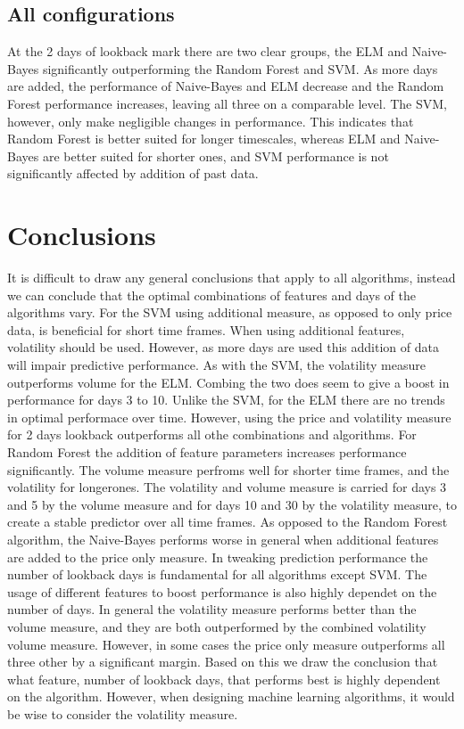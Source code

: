 \documentclass{article}
\begin{document}
\subsection{All configurations}
At the 2 days of lookback mark there are two clear groups, the ELM and Naive-Bayes significantly outperforming the Random Forest and SVM. As more days are added, the performance of Naive-Bayes and ELM decrease and the Random Forest performance increases, leaving all three on a comparable level. The SVM, however, only make negligible changes in performance. This indicates that Random Forest is better suited for longer timescales, whereas ELM and Naive-Bayes are better suited for shorter ones, and SVM performance is not significantly affected by addition of past data. 

\section{Conclusions}
It is difficult to draw any general conclusions that apply to all algorithms, instead we can conclude that the optimal combinations of features and days of the algorithms vary. For the SVM using additional measure, as opposed to only price data, is beneficial for short time frames. When using additional features, volatility should be used. However, as more days are used this addition of data will impair predictive performance. As with the SVM, the volatility measure outperforms volume for the ELM. Combing the two does seem to give a boost in performance for days 3 to 10. Unlike the SVM, for the ELM there are no trends in optimal performace over time. However, using the price and volatility measure for 2 days lookback outperforms all othe combinations and algorithms. For Random Forest the addition of feature parameters increases performance significantly. The volume measure perfroms well for shorter time frames, and the volatility for longerones. The volatility and volume measure is carried for days 3 and 5 by the volume measure and for days 10 and 30 by the volatility measure, to create a stable predictor over all time frames. As opposed to the Random Forest algorithm, the Naive-Bayes performs worse in general when additional features are added to the price only measure. In tweaking prediction performance the number of lookback days is fundamental for all algorithms except SVM. The usage of different features to boost performance is also highly dependet on the number of days. In general the volatility measure performs better than the volume measure, and they are both outperformed by the combined volatility volume measure.  However, in some cases the price only measure outperforms all three other by a significant margin. Based on this we draw the conclusion that what feature, number of lookback days, that performs best is highly dependent on the algorithm. However, when designing machine learning algorithms, it would be wise to consider the volatility measure. 
\end{document}
